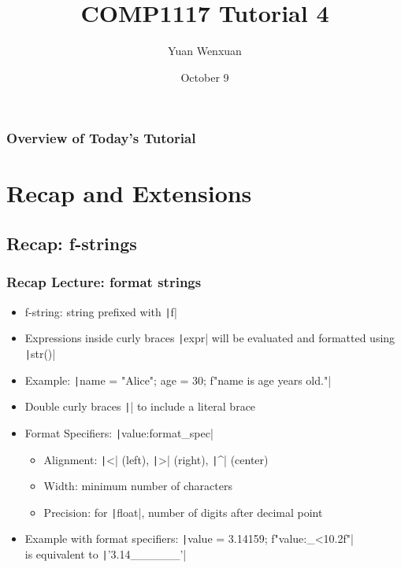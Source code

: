 \documentclass{beamer}
\title{COMP1117 Tutorial 4}
\author{Yuan Wenxuan}
\date{October 9}
\begin{document}
\frame{\titlepage}

\begin{frame}
    \frametitle{Overview of Today's Tutorial}
    \tableofcontents
\end{frame}

\section{Recap and Extensions}
\subsection{Recap: f-strings}
\begin{frame}
    \frametitle{Recap Lecture: format strings}

    \begin{itemize}
        \item f-string: string prefixed with \texttt|f|
        \item Expressions inside curly braces \texttt|{expr}| will be evaluated
              and formatted using \texttt|str()|
        \item Example: \texttt|name = "Alice"; age = 30; f"{name} is {age} years old."|
        \item Double curly braces \texttt|{{}}| to include a literal brace
        \item Format Specifiers: \texttt|{value:format_spec}|
              \begin{itemize}
                  \item Alignment: \texttt|<| (left), \texttt|>| (right), \texttt|^| (center)
                  \item Width: minimum number of characters
                  \item Precision: for \texttt|float|, number of digits after decimal point
              \end{itemize}
        \item Example with format specifiers:
              \texttt|value = 3.14159; f"{value:_<10.2f}"| \\
              is equivalent to \texttt|'3.14______'|
    \end{itemize}
\end{frame}
\end{document}
